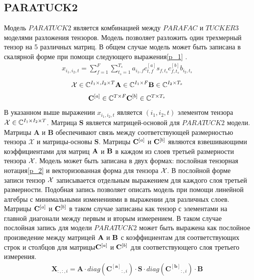\subsection{PARATUCK2}
Модель $PARATUCK2 $\cite{Book12} является комбинацией между $PARAFAC $\cite{Book6} и $TUCKER3$\cite{Book6} моделями разложения тензоров. Модель позволяет разложить один трехмерный тензор на 5 различных матриц. В общем случае модель может быть записана в скалярной форме при помощи следующего выражения\eqref{p_1} \cite{Book26}. 
\begin{align}
x_{i_1,i_2,t}=\sum^{F}_{f=1} \sum^{T_s}_{t_s=1}a_{i_1,f}c^{[a]}_{t,f}s_{f,t_s}c^{[b]}_{f,t_s}b_{i_2,t_s}
\label{p_1}
\end{align}
\begin{align*}
\mathcal{X} \in \mathbb{C}^{I_1 \times, I_2 \times T} \mathbf{A} \in \mathbb{C}^{I_1 \times F} \mathbf{B} \in \mathbb{C}^{I_2 \times T_s}
\end{align*}
\begin{align*}
\mathbf{C}^{[a]} \in \mathbb{C}^{T \times F} \mathbf{C}^{[b]} \in \mathbb{C}^{T \times T_s}
\end{align*}
В указанном выше выражении $x_{i_1,i_2,t}$  является $(i_1,i_2,t)$  элементом тензора $\mathcal{X} \in \mathbb{C}^{I_1 \times I_2 \times T }$. Матрица $\mathbf{S}$ является  матрицей-основой для $PARATUCK2$ модели. Матрицы $\mathbf{A}$ и $\mathbf{B}$ обеспечивают связь между соответствующей размерностью тензора $\mathcal{X}$ и  матрицы-основы $\mathbf{S}$\cite{Book12}. Матрицы $\mathbf{C}^{[a]}$ и $\mathbf{C}^{[b]}$ являются взвешивающими коэффициентами для матриц $\mathbf{A}$ и $\mathbf{B}$ в каждом из слоев третьей размерности тензора $\mathcal{X}$. 
Модель может быть записана в двух формах: послойная тензорная нотация\eqref{p_2} и векторизованная форма для тензора $\mathcal{X}$.
В послойной форме записи тензор $\mathcal{X}$ записывается отдельным выражением для каждого слоя третьей размерности.  Подобная запись позволяет описать модель при помощи линейной алгебры с минимальными изменениями в выражении для различных слоев. Матрицы $\mathbf{C}^{[a]}$ и $\mathbf{C}^{[b]}$ в таком случае записаны как тензор с элементами на главной диагонали между первым и вторым измерением. В таком случае послойная запись для модели $PARATUCK2 $ может быть выражена как послойное произведение между матрицей $\mathbf{A}$ и $\mathbf{B}$ с коэффициентам для соответствующих строк и столбцов для матрицы$\mathbf{C}^{[a]}$ и $\mathbf{C}^{[b]}$ для соответствующего слоя третьего измерения\cite{Book12}.
\begin{align}
\mathbf{X}_{:,:,i}=\mathbf{A}\cdot diag(\mathbf{C^{[a]}}_{:,i})\cdot \mathbf{S}\cdot diag(\mathbf{C^{[b]}}_{:,i})\cdot \mathbf{B}
\label{p_2}
\end{align}
